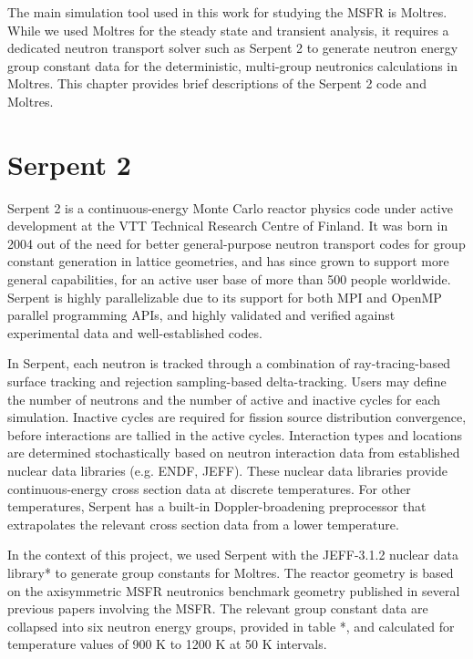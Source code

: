 The main simulation tool used in this work for studying the \gls{MSFR} is
Moltres. While we used Moltres for the steady state and transient analysis, it
requires a dedicated neutron transport solver such as Serpent 2 to generate
neutron energy group constant data for the deterministic, multi-group
neutronics calculations in Moltres. This chapter provides brief descriptions
of the Serpent 2 code and Moltres.

\section{Serpent 2}

Serpent 2 is a continuous-energy Monte Carlo reactor physics code under
active development at the VTT Technical Research Centre of Finland. It was
born in 2004 out of the need for better general-purpose neutron transport
codes for group constant generation in lattice geometries, and has since grown
to support more general capabilities, for an active user base of more than 500
people worldwide. Serpent is highly parallelizable due to its support for
both MPI and OpenMP parallel programming APIs, and highly validated and
verified against experimental data and well-established codes.

In Serpent, each neutron is tracked through a combination of ray-tracing-based
surface tracking and rejection sampling-based delta-tracking. Users may define
the number of neutrons and the number of active and inactive cycles for each
simulation. Inactive cycles are required for fission source distribution
convergence, before interactions are tallied in the active cycles.
Interaction types and locations are
determined stochastically based on neutron interaction data from established
nuclear data libraries (e.g. ENDF, JEFF). These nuclear data libraries provide
continuous-energy cross section data at discrete temperatures. For other
temperatures, Serpent has a built-in Doppler-broadening preprocessor that
extrapolates the relevant cross section data from a lower temperature. 

In the context of this project, we used Serpent with the JEFF-3.1.2 nuclear
data library* to generate group constants
for Moltres. The reactor geometry is based on the axisymmetric \gls{MSFR}
neutronics benchmark geometry published in several previous papers involving
the \gls{MSFR}. The relevant group constant data are collapsed into six
neutron energy groups, provided in table *, and calculated for temperature
values of 900 K to 1200 K at 50 K intervals.


